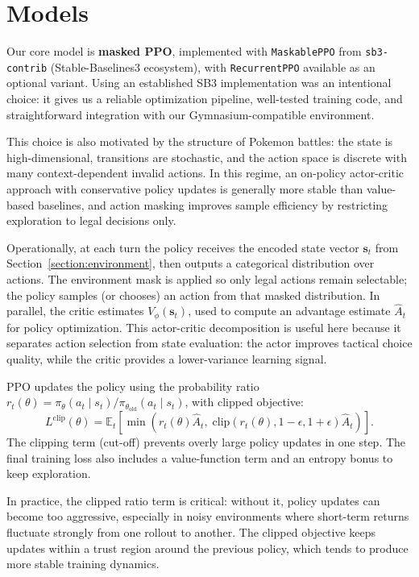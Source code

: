 \section{Models}
\label{section:models}

Our core model is \textbf{masked PPO}, implemented with \texttt{MaskablePPO} from
\texttt{sb3-contrib} (Stable-Baselines3 ecosystem), with \texttt{RecurrentPPO} available as an optional variant.
Using an established SB3 implementation was an intentional choice: it gives us a reliable optimization pipeline,
well-tested training code, and straightforward integration with our Gymnasium-compatible environment.

This choice is also motivated by the structure of Pokemon battles: the state is high-dimensional,
transitions are stochastic, and the action space is discrete with many context-dependent invalid actions.
In this regime, an on-policy actor-critic approach with conservative policy updates is generally more stable
than value-based baselines, and action masking improves sample efficiency by restricting exploration to legal
decisions only.

Operationally, at each turn the policy receives the encoded state vector \(\mathbf{s}_t\) from
Section~\ref{section:environment}, then outputs a categorical distribution over actions.
The environment mask is applied so only legal actions remain selectable; the policy samples (or chooses)
an action from that masked distribution. In parallel, the critic estimates \(V_\phi(\mathbf{s}_t)\), used
to compute an advantage estimate \(\hat{A}_t\) for policy optimization.
This actor-critic decomposition is useful here because it separates action selection from state evaluation:
the actor improves tactical choice quality, while the critic provides a lower-variance learning signal.

PPO updates the policy using the probability ratio
\(r_t(\theta)=\pi_\theta(a_t\mid s_t)/\pi_{\theta_{\text{old}}}(a_t\mid s_t)\), with clipped objective:
\[
L^{\text{clip}}(\theta)=\mathbb{E}_t\left[\min\left(r_t(\theta)\hat{A}_t,\;\mathrm{clip}(r_t(\theta),1-\epsilon,1+\epsilon)\hat{A}_t\right)\right].
\]
The clipping term (cut-off) prevents overly large policy updates in one step.
The final training loss also includes a value-function term and an entropy bonus to keep exploration.

In practice, the clipped ratio term is critical: without it, policy updates can become too aggressive,
especially in noisy environments where short-term returns fluctuate strongly from one rollout to another.
The clipped objective keeps updates within a trust region around the previous policy, which tends to produce
more stable training dynamics.


